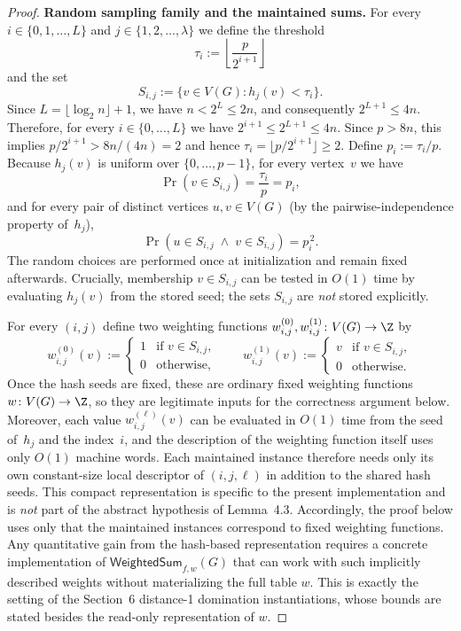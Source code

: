 \begin{proof}
\smallskip
\noindent\textbf{Random sampling family and the maintained sums.}
For every $i\in\{0,1,\dots,L\}$ and $j\in\{1,2,\dots,\lambda\}$ we define
the threshold
\[
\tau_i := \left\lfloor \frac{p}{2^{i+1}} \right\rfloor
\]
and the set
\[
S_{i,j} := \bigl\{v\in V(G) : h_j(v) < \tau_i\bigr\}.
\]
Since $L=\lfloor\log_2 n\rfloor+1$, we have $n<2^{L}\le 2n$,
and consequently $2^{L+1}\le 4n$.
Therefore, for every $i\in\{0,\dots,L\}$ we have
$2^{i+1}\le 2^{L+1}\le 4n$.
Since $p>8n$, this implies $p/2^{i+1} > 8n/(4n)=2$ and hence
$\tau_i=\lfloor p/2^{i+1}\rfloor \ge 2$.
Define $p_i := \tau_i/p$.
Because $h_j(v)$ is uniform over $\{0,\dots,p-1\}$,
for every vertex~$v$ we have
\[
\Pr(v\in S_{i,j})
= \frac{\tau_i}{p}
= p_i,
\]
and for every pair of distinct vertices $u,v\in V(G)$
(by the pairwise-independence property of~$h_j$),
\begin{equation}\label{eq:pairwise}
\Pr(u\in S_{i,j} \;\wedge\; v\in S_{i,j})
= p_i^{\,2}.
\end{equation}
The random choices are performed once at initialization and remain fixed
afterwards.
Crucially, membership $v\in S_{i,j}$ can be tested in $O(1)$ time by
evaluating $h_j(v)$ from the stored seed; the sets $S_{i,j}$ are
\emph{not} stored explicitly.

For every $(i,j)$ define two weighting functions
$w^{(0)}_{i,j},w^{(1)}_{i,j}\colon V(G)\to\Z$ by
\[
w^{(0)}_{i,j}(v) :=
\begin{cases}
1 & \text{if } v\in S_{i,j},\\
0 & \text{otherwise,}
\end{cases}
\qquad
w^{(1)}_{i,j}(v) :=
\begin{cases}
v & \text{if } v\in S_{i,j},\\
0 & \text{otherwise.}
\end{cases}
\]
Once the hash seeds are fixed, these are ordinary fixed weighting functions
$w\colon V(G)\to\Z$, so they are legitimate inputs for the correctness
argument below.
Moreover, each value $w^{(\ell)}_{i,j}(v)$ can be evaluated in $O(1)$ time from
the seed of~$h_j$ and the index~$i$, and the description of the weighting
function itself uses only $O(1)$ machine words.
Each maintained instance therefore needs only its own constant-size local
descriptor of $(i,j,\ell)$ in addition to the shared hash seeds.
This compact representation is specific to the present implementation and is
\emph{not} part of the abstract hypothesis of Lemma~4.3.
Accordingly, the proof below uses only that the maintained instances correspond
to fixed weighting functions.
Any quantitative gain from the hash-based representation requires a concrete
implementation of $\mathsf{WeightedSum}_{f,w}(G)$ that can work with such
implicitly described weights without materializing the full table $w$.
This is exactly the setting of the Section~6 distance-1 domination
instantiations, whose bounds are stated besides the read-only representation of
$w$.


\end{proof}
